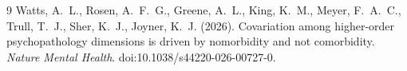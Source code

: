 \documentclass[11pt]{article}
\theoremstyle{definition}
\begin{document}
\begin{thebibliography}{9}
 Watts, A.~L., Rosen, A.~F.~G., Greene, A.~L., King, K.~M., Meyer, F.~A.~C., Trull, T.~J., Sher, K.~J., Joyner, K.~J. (2026). Covariation among higher-order psychopathology dimensions is driven by nomorbidity and not comorbidity. \emph{Nature Mental Health}. doi:10.1038/s44220-026-00727-0.
\end{thebibliography}
\end{document}
